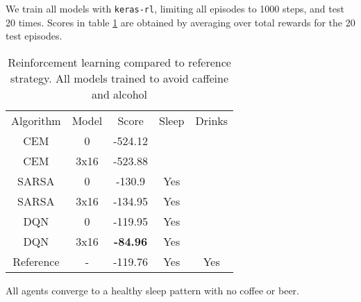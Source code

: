 We train all models with \texttt{keras-rl}, limiting all episodes to 1000 steps, and test 20 times.
Scores in table \ref{tab:results} are obtained by averaging over total rewards for the 20 test episodes.

\begin{table}[H]
    \centering
    \begin{tabular}{c|c|c|c|c}
         Algorithm & Model & Score & Sleep & Drinks \\
         CEM & 0 & -524.12 &  &   \\
         CEM & 3x16 & -523.88 & & \\
         SARSA & 0 & -130.9 & Yes & \\
         SARSA & 3x16 & -134.95 & Yes & \\
         DQN & 0 & -119.95 & Yes &  \\
         DQN & 3x16 & \textbf{-84.96} & Yes &  \\
         Reference & - & -119.76 & Yes & Yes 
    \end{tabular}
    \caption{Reinforcement learning compared to reference strategy. All models trained to avoid caffeine and alcohol}
    \label{tab:results}
\end{table}

All agents converge to a healthy sleep pattern with no coffee or beer.